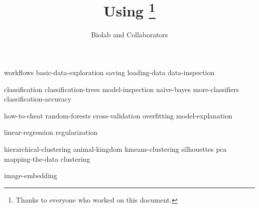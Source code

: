 \documentclass[symmetric, justified, a4paper]{tufte-book}
\title{Using \mutation\thanks{Thanks to everyone who worked on this document.}}
\author[Biolab and Collaborators]{Biolab and Collaborators}
\begin{document}
\frontmatter

\maketitle



\tableofcontents

% 

\mainmatter



{workflows}
{basic-data-exploration}
{saving}
{loading-data}
{data-inspection}


{classification}
{classification-trees}
{model-inspection}
{naive-bayes}
{more-classifiers}
{classification-accuracy}

{how-to-cheat}
{random-forests}
{cross-validation}
{overfitting}
{model-explanation}


{linear-regression}
{regularization}


{hierarchical-clustering}
{animal-kingdom}
{kmeans-clustering}
{silhouettes}
{pca}
{mapping-the-data}
{clustering}


{image-embedding}

\backmatter





\printindex
\end{document}
